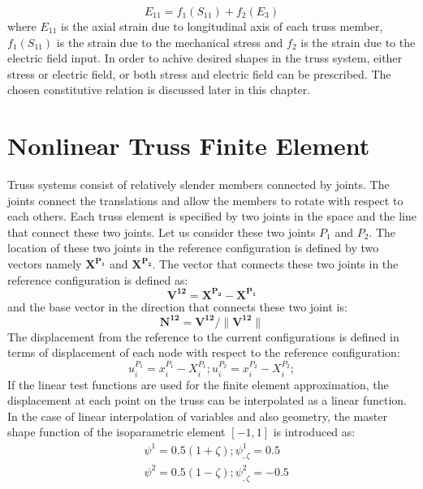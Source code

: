 \begin{equation}
E_{11}=f_1(S_{11})+f_2(E_3)
\label{one_constitutive_equation}
\end{equation}
where $E_{11}$ is the axial strain due to longitudinal axis of each truss member, $f_1(S_{11})$ is the strain due to the mechanical stress and $f_2$ is the strain due to the electric field input.
In order to achive desired shapes in the truss system, either stress or electric field, or both stress and electric field can be prescribed.
The chosen constitutive relation is discussed later in this chapter.
 
\section{Nonlinear Truss Finite Element}
Truss systems consist of relatively slender members connected by joints.
The joints connect the translations and allow the members to rotate with respect to each others.
Each truss element is specified by two joints in the space and the line that connect these two joints.
Let us consider these two joints $P_1$ and $P_2$.
The location of these two joints in the reference configuration is defined by two vectors namely $\mathbf {X^{P_1}}$ and $\mathbf {X^{P_2}}$.
The vector that connects these two joints in the reference configuration is defined as:
\begin{equation}
\mathbf {V^{12}=X^{P_2}-X^{P_1} } 
\end{equation}
and the base vector in the direction that connects these two joint is:
\begin{equation}
\mathbf {N^{12}=V^{12}/ \|V^{12}\| }
\end{equation}
The displacement from the reference to the current configurations is defined in terms of displacement of each node with respect to the reference configuration:
\begin{equation}
u^{P_1}_i=x^{P_1}_i-X^{P_1}_i ; u^{P_2}_i=x^{P_2}_i-X^{P_2}_i ;  
\end{equation}
If the linear test functions are used for the finite element approximation,
 the displacement at each point on the truss can be interpolated as a linear function.
In the case of linear interpolation of variables and also geometry, the master shape function of the isoparametric element $[-1,1]$ is introduced as:
\begin{equation}
\begin{aligned}
& \psi^1=0.5(1+\zeta); \psi^1_{,\zeta}= 0.5 \\
& \psi^2=0.5(1-\zeta); \psi^2_{,\zeta}=-0.5
\end{aligned}
\label{shape_function_truss} 
\end{equation}

